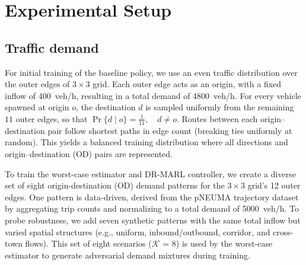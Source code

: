 \documentclass{ifacconf}
\newcommand{\1}{\mbox{1}\hspace{-0.25em}\mbox{l}}
\begin{document}








\section{Experimental Setup}
\label{sec:setup}


\subsection{Traffic demand}
\label{subsec:demand}
For initial training of the baseline policy, we use an even traffic distribution over the outer edges of  $3\times3$ grid. Each outer edge acts as an origin, with a fixed inflow of \SI{400}{veh/h}, resulting in a total demand of \SI{4800}{veh/h}. For every vehicle spawned at origin $o$, the destination $d$ is sampled uniformly from the remaining $11$ outer edges, so that
$\Pr\{d \mid o\} = \tfrac{1}{11}, \quad d \neq o.$
Routes between each origin–destination pair follow shortest paths in edge count (breaking ties uniformly at random). This yields a balanced training distribution where all directions and origin–destination (OD) pairs are represented. 

To train the worst-case estimator and DR-MARL controller, we create a diverse set of eight origin-destination (OD) demand patterns for the $3{\times}3$ grid's 12 outer edges. One pattern is data-driven, derived from the pNEUMA trajectory dataset~\citep{BarmpounakisGeroliminis2020} by aggregating trip counts and normalizing to a total demand of \SI{5000}{veh/h}. To probe robustness, we add seven synthetic patterns with the same total inflow but varied spatial structures (e.g., uniform, inbound/outbound, corridor, and cross-town flows). This set of eight scenarios ($\mathcal{K}$ = 8) is used by the worst-case estimator to generate adversarial demand mixtures during training.
\end{document}
